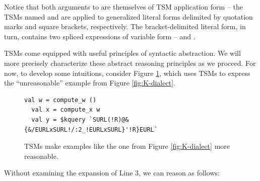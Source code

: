 Notice that both arguments to  are themselves of TSM application form -- the TSMs named  and  are applied to generalized literal forms  delimited by quotation marks and square brackets, respectively. The bracket-delimited literal form, in turn, contains two spliced expressions of variable form --  and .
 



TSMs come equipped with useful principles of syntactic abstraction. We will more precisely characterize these abstract reasoning principles as we proceed. For now, to develop some intuitions, consider Figure \ref{fig:K-tsm-example}, which uses TSMs to express the ``unreasonable'' example from Figure \ref{fig:K-dialect}.
\begin{figure}[h]
\vspace{-3px}
\begin{lstlisting}[numbers=none,xleftmargin=0px]
  val w = compute_w ()
  val x = compute_x w
  val y = $kquery `SURL(!R)@&{&/EURLxSURL!/:2_!EURLxSURL}'!R}EURL`
\end{lstlisting}
\vspace{-5px}
\caption{TSMs make examples like the one from Figure \ref{fig:K-dialect} more reasonable.}
\vspace{-3px}
\label{fig:K-tsm-example}
\end{figure}

\noindent
Without examining the expansion of Line 3, we can reason as follows:

